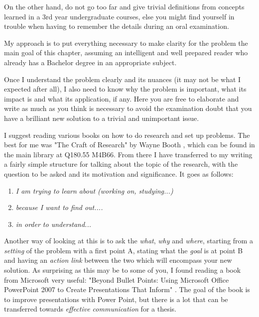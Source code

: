 On the other hand, do not go too far and give trivial definitions from concepts learned in a 3rd year undergraduate courses, else you might find yourself in trouble when having to remember the details during an oral examination.

My approach is to put everything necessary to make clarity for
the problem the main goal of this chapter, assuming an intelligent and well prepared reader who already has a Bachelor degree in an appropriate subject.

Once I understand the problem clearly and its nuances (it may not be what I expected after all), I also need to know why the problem is important, what its impact is and what its application, if any. Here you are free to elaborate and write as much as you think is necessary to avoid the examination doubt that you have a brilliant new solution to a trivial and unimportant issue.

I suggest reading various books on how to do research and set up problems. The best for me was "The Craft of Research" by Wayne Booth \cite{booth1}, which can be found in the main library at Q180.55 M4B66. From there I have transferred to my writing a fairly simple structure for talking about the topic of the research, with the question to be asked and its motivation and significance. It goes as follows:
\begin{enumerate}
\item {\textit{I am trying to learn about (working on, studying...)}}
\item {\textit{because I want to find out....}}
\item {\textit{in order to understand...}}
\end{enumerate}

Another way of looking at this is to ask the
\textit{what}, \textit{why} and \textit{where}, starting from a \textit{setting} of the problem with a first point A, stating what the \textit{goal} is at point B and having an \textit{action link} between the two which will encompass your new solution. As surprising as this may be to some of you, I found reading a book from Microsoft very useful: "Beyond Bullet Points: Using Microsoft Office PowerPoint 2007 to Create Presentations That Inform" \cite {atkin}. The goal of the book is to improve presentations with Power Point, but there is a lot that can be transferred towards \textit{effective communication} for a thesis.


